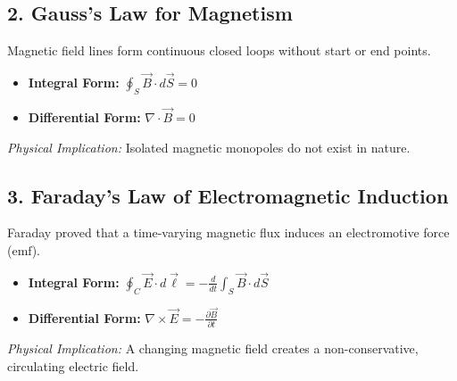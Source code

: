 \subsection{2. Gauss's Law for Magnetism}
Magnetic field lines form continuous closed loops without start or end points.
\begin{itemize}[itemsep=2pt]
    \item \textbf{Integral Form:} $\oint_S \vec{B} \cdot d\vec{S} = 0$
    \item \textbf{Differential Form:} $\nabla \cdot \vec{B} = 0$
\end{itemize}
\textit{Physical Implication:} Isolated magnetic monopoles do not exist in nature.

\subsection{3. Faraday's Law of Electromagnetic Induction}
Faraday proved that a time-varying magnetic flux induces an electromotive force ($\text{emf}$).
\begin{itemize}[itemsep=2pt]
    \item \textbf{Integral Form:} $\oint_C \vec{E} \cdot d\vec{\ell} = -\frac{d}{dt}\int_S \vec{B} \cdot d\vec{S}$
    \item \textbf{Differential Form:} $\nabla \times \vec{E} = -\frac{\partial \vec{B}}{\partial t}$
\end{itemize}
\textit{Physical Implication:} A changing magnetic field creates a non-conservative, circulating electric field.

